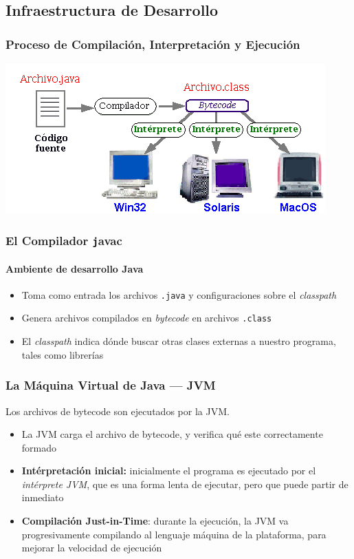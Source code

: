\documentclass{beamer}
\begin{document}
\subsection{Infraestructura de Desarrollo}  

\begin{frame}
  \frametitle{Proceso de Compilación, Interpretación y Ejecución}
  \begin{center}
    \includegraphics[scale=.65]{images/funcionamiento_java.png}
  \end{center}
\end{frame}  

\begin{frame}
  \frametitle{El Compilador {\texttt javac}}
  \framesubtitle{Ambiente de desarrollo Java}

  \begin{itemize}    
    \item Toma como entrada los archivos {\tt *.java} y configuraciones sobre el \emph{classpath}
    \item Genera archivos compilados en \emph{bytecode} en archivos {\tt *.class}      
    \item El \emph{classpath} indica dónde buscar otras clases
      externas a nuestro programa, tales como librerías
  \end{itemize}
\end{frame}

\begin{frame}
  \frametitle{La Máquina Virtual de Java --- JVM}

  Los archivos de bytecode son ejecutados por la JVM.

  \begin{itemize}
  \item La JVM carga el archivo de bytecode, y verifica qué este
    correctamente formado
    
  \item \textbf{Intérpretación inicial:} inicialmente el programa es
    ejecutado por el \emph{intérprete JVM}, que es una forma lenta de
    ejecutar, pero que puede partir de inmediato
    
  \item \textbf{Compilación Just-in-Time}: durante la ejecución, la
    JVM va progresivamente compilando al lenguaje máquina de la
    plataforma, para mejorar la velocidad de ejecución
    
  \end{itemize}
  
\end{frame}
\end{document}
